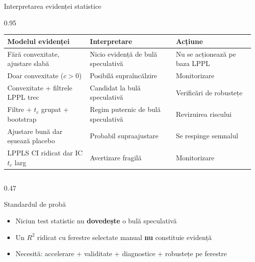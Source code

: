 \documentclass[9pt, aspectratio=169, t]{beamer}
\begin{document}
\begin{frame}{Interpretarea evidenței statistice}
    \begin{cminipage}{0.95\textwidth}
    {\scriptsize
    \begin{center}
        \begin{tabular}{p{4.8cm}p{3cm}p{4cm}}
            \toprule
            \textbf{Modelul evidenței} & \textbf{Interpretare} & \textbf{Acțiune} \\
            \midrule
            Fără convexitate, ajustare slabă & Nicio evidență de bulă speculativă & Nu se acționează pe baza LPPL \\
            \addlinespace
            Doar convexitate ($c>0$) & Posibilă supraîncălzire & Monitorizare \\
            \addlinespace
            Convexitate + filtrele LPPL trec & Candidat la bulă speculativă & Verificări de robustețe \\
            \addlinespace
            Filtre + $t_c$ grupat + bootstrap & Regim puternic de bulă speculativă & Revizuirea riscului \\
            \addlinespace
            Ajustare bună dar eșuează placebo & Probabil supraajustare & Se respinge semnalul \\
            \addlinespace
            LPPLS CI ridicat dar IC $t_c$ larg & Avertizare fragilă & Monitorizare \\
            \bottomrule
        \end{tabular}
    \end{center}
    \vspace{-2mm}
    \begin{columns}[T]
        \begin{column}{0.47\textwidth}
            \begin{alertblock}{Standardul de probă}
                \begin{itemize}\setlength{\itemsep}{0pt}
                    \item Niciun test statistic nu \textbf{dovedește} o bulă speculativă
                    \item Un $R^2$ ridicat cu ferestre selectate manual \textbf{nu} constituie evidență
                    \item Necesită: accelerare + validitate + diagnostice + robustețe pe ferestre
                \end{itemize}
            \end{alertblock}
        \end{column}
    \end{columns}
    }
    \end{cminipage}
\end{frame}
\end{document}
